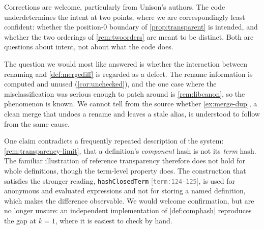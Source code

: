 \documentclass[11pt]{article}
\theoremstyle{definition}
\theoremstyle{plain}
\theoremstyle{remark}
\newcommand{\src}[1]{{\footnotesize\textcolor{gray}{[\texttt{#1}]}}}
\begin{document}
Corrections are welcome, particularly from Unison's authors. The code underdetermines the intent at
two points, where we are correspondingly least confident: whether the position-$0$ boundary of
\cref{prop:transparent} is intended, and whether the two orderings of \cref{rem:twoorders} are meant
to be distinct. Both are questions about intent, not about what the code does.

The question we would most like answered is whether the interaction between renaming and
\cref{def:mergediff} is regarded as a defect. The rename information is computed and unused
(\cref{cor:unchecked}), and the one case where the misclassification was serious enough to patch
around is \cref{rem:libcanon}, so the phenomenon is known. We cannot tell from the source whether
\cref{ex:merge-dup}, a clean merge that undoes a rename and leaves a stale alias, is understood to
follow from the same cause.

One claim contradicts a frequently repeated description of the system: \cref{rem:transparency-limit},
that a definition's \emph{component} hash is not its \emph{term} hash. The familiar illustration of
reference transparency therefore does not hold for whole definitions, though the term-level property
does. The construction that satisfies the stronger reading, \texttt{hashClosedTerm}
\src{term:124-125}, is used for anonymous and evaluated expressions and not for storing a named
definition, which makes the difference observable. We would welcome confirmation, but are no longer
unsure: an independent implementation of \cref{def:comphash} reproduces the gap at $k = 1$, where it
is easiest to check by hand.
\end{document}
